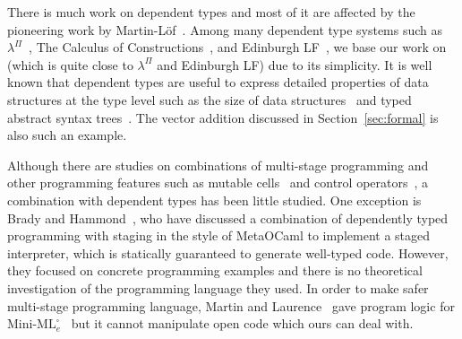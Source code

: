 





There is much work on dependent types and most of it are affected by
the pioneering work by Martin-L\"{o}f~\cite{martin1973intuitionistic}.
Among many dependent type systems such as
$\lambda^\Pi$~\cite{Meyer1986}, The Calculus of
Constructions~\cite{coquand:inria-00076024}, and Edinburgh
LF~\cite{harper1993framework}, we base our work on \LLF~\cite{attapl}
(which is quite close to $\lambda^\Pi$ and Edinburgh LF) due to its
simplicity.  It is well known that dependent types are useful to
express detailed properties of data structures at the type level such
as the size of data structures~\cite{Xi98} and typed abstract syntax
trees~\cite{DBLP:conf/dsl/LeijenM99,DBLP:conf/popl/XiCC03}.  The
vector addition discussed in Section~\ref{sec:formal} is also such an
example.




Although there are studies on combinations of multi-stage programming and
other programming features such as mutable cells~\cite{kiselyov2016refined} and
control operators~\cite{KameyamaKiselyovShan09PEPM,oishi2017staging}, a
combination with dependent types has been little studied. One exception is
Brady and Hammond~\cite{brady2006dependently}, who have discussed a
combination of dependently typed programming with staging in the style of
MetaOCaml to implement a staged interpreter, which is statically guaranteed
to generate well-typed code. However, they focused on concrete programming
examples and there is no theoretical investigation of the programming
language they used. In order to make safer multi-stage programming language, 
Martin and Laurence~\cite{martin2015HGRTMP} gave program logic for
\(\text{Mini-ML}^\square_e\)~\cite{DaviesPfenning01JACM} but
it cannot manipulate open code which ours can deal with.


